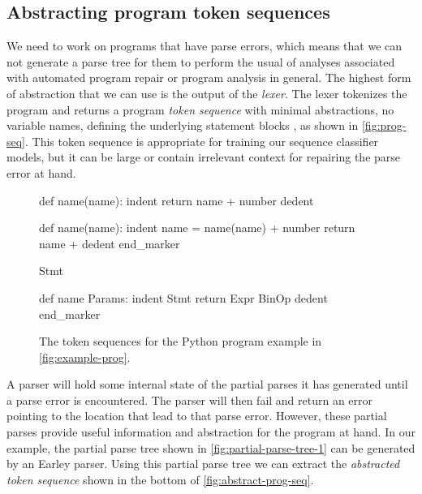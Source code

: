 \subsection{Abstracting program token sequences}
\label{sec:overview:abstraction}

We need to work on programs that have parse errors, which means that we can not
generate a parse tree for them to perform the usual of analyses associated with
automated program repair \citep{Sakkas_2020, Martinez_2013, Gulwani_2018,
Wang_2018} or program analysis in general.
%
The highest form of abstraction that we can use is the output of the
\emph{lexer}. The lexer tokenizes the program and returns a program \emph{token
sequence} with minimal abstractions, \eg no variable names, defining the
underlying statement blocks \etc, as shown in \autoref{fig:prog-seq}. This token
sequence is appropriate for training our sequence classifier models, but it can
be large or contain irrelevant context for repairing the parse error at hand.

\begin{figure}[t]
\centering
\begin{minipage}[t]{0.56\linewidth}
\centering
\begin{ecode}
def name(name): \n
indent return name + number \n
dedent \n

def name(name): \n
indent name = name(name) + number \n
return name + \n
dedent end_marker
\end{ecode}
\label{fig:prog-seq}
\end{minipage}%
\hspace{0.02\linewidth}%
\begin{minipage}[t]{0.42\linewidth}
\centering
\begin{ecode}
Stmt \n

def name Params: \n
indent Stmt \n
return Expr BinOp \n
dedent end_marker
\end{ecode}
\label{fig:abstract-prog-seq}
\end{minipage}
\caption{The token sequences for the Python program example in \autoref{fig:example-prog}.}
\end{figure}

A parser will hold some internal state of the partial parses it has
generated until a parse error is encountered. The parser will then fail and
return an error pointing to the location that lead to that parse error. However,
these partial parses provide useful information and abstraction for the program
at hand. In our example, the partial parse tree shown in
\autoref{fig:partial-parse-tree-1} can be generated by an Earley parser. Using
this partial parse tree we can extract the \emph{abstracted token sequence}
shown in the bottom of \autoref{fig:abstract-prog-seq}.

